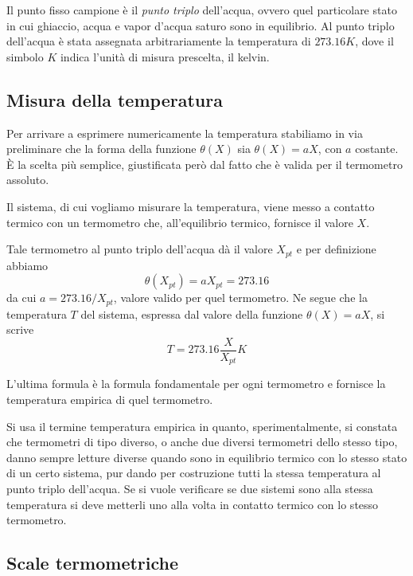 \documentclass[class=book, crop=false, oneside, 12pt]{standalone}
\begin{document}
Il punto fisso campione è il \emph{punto triplo} dell'acqua, ovvero quel particolare stato in cui ghiaccio, acqua e vapor d'acqua saturo sono in equilibrio. 
Al punto triplo dell'acqua è stata assegnata arbitrariamente la temperatura di \(273.16 K\), dove il simbolo \(K\) indica l'unità di misura prescelta, il kelvin.

\subsection{Misura della temperatura}

Per arrivare a esprimere numericamente la temperatura stabiliamo in via preliminare che la forma della funzione \(\theta(X)\) sia \(\theta(X) = aX\), con \(a\) costante.
È la scelta più semplice, giustificata però dal fatto che è valida per il termometro assoluto.

Il sistema, di cui vogliamo misurare la temperatura, viene messo a contatto termico con un termometro che, all'equilibrio termico, fornisce il valore \(X\).

Tale termometro al punto triplo dell'acqua dà il valore \(X_{pt}\) e per definizione abbiamo
\begin{equation*}
    \theta (X_{pt}) = a X_{pt} = 273.16
\end{equation*}
da cui \(a = 273.16/X_{pt}\), valore valido per quel termometro. Ne segue che la temperatura \(T\) del sistema, espressa dal valore della funzione \(\theta (X) = a X\), si scrive
\begin{equation}
    T = 273.16 \frac{X}{X_{pt}} K    
\end{equation}

L'ultima formula è la formula fondamentale per ogni termometro e fornisce la temperatura empirica di quel termometro.

Si usa il termine temperatura empirica in quanto, sperimentalmente, si constata che termometri di tipo diverso, o anche due diversi termometri dello stesso tipo, danno sempre letture diverse quando sono in equilibrio termico con lo stesso stato di un certo sistema, pur dando per costruzione tutti la stessa temperatura al punto triplo dell'acqua.
Se si vuole verificare se due sistemi sono alla stessa temperatura si deve metterli uno alla volta in contatto termico con lo stesso termometro. 

\subsection{Scale termometriche}
\end{document}
